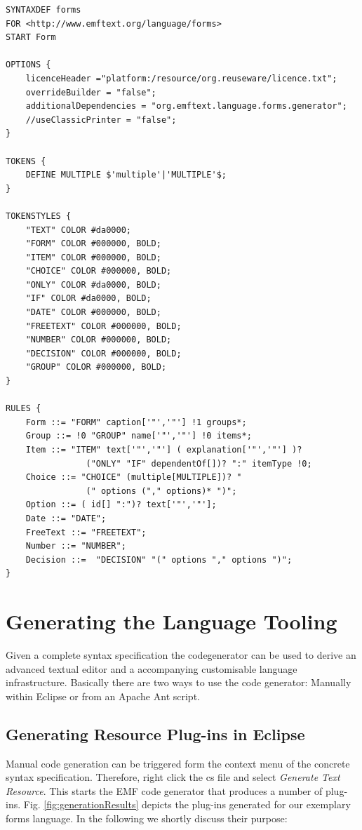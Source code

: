  
	\begin{lstlisting}[label=lst:formsCs, caption=Concrete syntax specification for
	the exemplary forms language written in the cs-language] 
SYNTAXDEF forms
FOR <http://www.emftext.org/language/forms>
START Form

OPTIONS {
	licenceHeader ="platform:/resource/org.reuseware/licence.txt";
	overrideBuilder = "false";
	additionalDependencies = "org.emftext.language.forms.generator";
	//useClassicPrinter = "false";
}

TOKENS {
	DEFINE MULTIPLE $'multiple'|'MULTIPLE'$;
}

TOKENSTYLES {
	"TEXT" COLOR #da0000;
	"FORM" COLOR #000000, BOLD;
	"ITEM" COLOR #000000, BOLD;
	"CHOICE" COLOR #000000, BOLD;
	"ONLY" COLOR #da0000, BOLD;
	"IF" COLOR #da0000, BOLD;
	"DATE" COLOR #000000, BOLD;
	"FREETEXT" COLOR #000000, BOLD;
	"NUMBER" COLOR #000000, BOLD;
	"DECISION" COLOR #000000, BOLD;
	"GROUP" COLOR #000000, BOLD;
}
  
RULES {
	Form ::= "FORM" caption['"','"'] !1 groups*;
	Group ::= !0 "GROUP" name['"','"'] !0 items*;
	Item ::= "ITEM" text['"','"'] ( explanation['"','"'] )? 
				("ONLY" "IF" dependentOf[])? ":" itemType !0;
	Choice ::= "CHOICE" (multiple[MULTIPLE])? "
				(" options ("," options)* ")";
	Option ::= ( id[] ":")? text['"','"'];
	Date ::= "DATE";
	FreeText ::= "FREETEXT";
	Number ::= "NUMBER";
	Decision ::=  "DECISION" "(" options "," options ")"; 
}

	\end{lstlisting} 
 


\section{Generating the Language Tooling}
\label{sec:process_generating}
	Given a complete syntax specification the \EMFText codegenerator can be used to
	derive an advanced textual editor and a accompanying customisable
	language infrastructure. Basically there are two ways to use the code
	generator: Manually within Eclipse or from an Apache Ant script.


	\subsection{Generating Resource Plug-ins in Eclipse}
	Manual code generation can be triggered form the context menu of the concrete
	syntax specification. Therefore, right click the cs file and select
	\emph{Generate Text Resource}. This starts the EMF code generator that produces
	a number of plug-ins. Fig. \ref{fig:generationResults} depicts the plug-ins
	generated for our exemplary forms language. In the following we shortly discuss
	their purpose:
	
